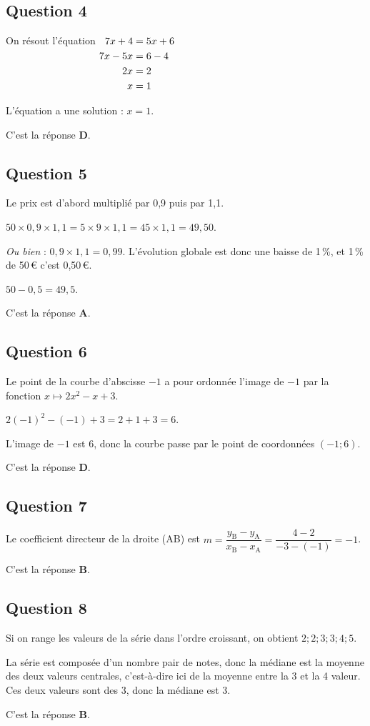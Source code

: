 \subsection*{Question 4}
	On résout l'équation $\aligned[t] 7 x+4 & = 5 x+ 6 \\
	7x-5x &= 6-4\\
	2x &= 2\\
	x &= 1
	\endaligned$

	L'équation a une solution : $x = 1$.

	C'est la réponse \textbf{D}.

\subsection*{Question 5}
	Le prix est d'abord multiplié par 0,9 puis par 1,1.

	$50 \times 0,9 \times 1,1= 5 \times 9 \times 1,1 = 45 \times 1,1 = 49,50$.

	\emph{Ou bien} : $0,9\times 1,1= 0,99$. \quad L'évolution globale est donc une baisse de 1\,\%, et 1\,\% de 50\,\euro{} c'est 0,50\,\euro{}.

	$50 - 0,5 = 49,5$.

	C'est la réponse \textbf{A}.

\subsection*{Question 6}
	Le point de la courbe d'abscisse $-1$ a pour ordonnée l'image de $-1$ par la fonction $x \mapsto 2 x^{2}-x+3$.

	$2 (-1)^{2}-(-1)+3=2+1+3=6$.

	L'image de $-1$ est 6, donc la courbe passe par le point de coordonnées $(-1 ; 6)$.

	C'est la réponse \textbf{D}.

\subsection*{Question 7}
	Le coefficient directeur de la droite (AB) est \quad $m=\dfrac{y_{\mathrm{B}}-y_{\mathrm{A}}}{x_{\mathrm{B}}-x_{\mathrm{A}}}=\dfrac{4-2}{-3-(-1)}=-1$.

	C'est la réponse \textbf{B}.

\subsection*{Question 8}
	Si on range les valeurs de la série dans l'ordre croissant, on obtient \quad $2 ; 2 ; 3 ; 3 ; 4 ; 5$.

	La série est composée d'un nombre pair de notes, donc la médiane est la moyenne des deux valeurs centrales, c'est-à-dire ici de la moyenne entre la 3 et la 4 valeur. Ces deux valeurs sont des 3, donc la médiane est 3.

	C'est la réponse \textbf{B}.



